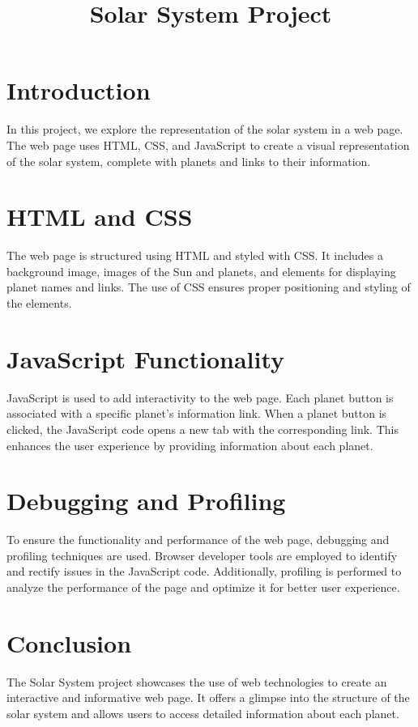 \documentclass{article}
\title{Solar System Project}
\begin{document}
\maketitle

\section{Introduction}
In this project, we explore the representation of the solar system in a web page. The web page uses HTML, CSS, and JavaScript to create a visual representation of the solar system, complete with planets and links to their information.

\section{HTML and CSS}
The web page is structured using HTML and styled with CSS. It includes a background image, images of the Sun and planets, and elements for displaying planet names and links. The use of CSS ensures proper positioning and styling of the elements.

\section{JavaScript Functionality}
JavaScript is used to add interactivity to the web page. Each planet button is associated with a specific planet's information link. When a planet button is clicked, the JavaScript code opens a new tab with the corresponding link. This enhances the user experience by providing information about each planet.

\section{Debugging and Profiling}
To ensure the functionality and performance of the web page, debugging and profiling techniques are used. Browser developer tools are employed to identify and rectify issues in the JavaScript code. Additionally, profiling is performed to analyze the performance of the page and optimize it for better user experience.

\section{Conclusion}
The Solar System project showcases the use of web technologies to create an interactive and informative web page. It offers a glimpse into the structure of the solar system and allows users to access detailed information about each planet.
\end{document}
